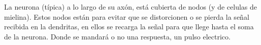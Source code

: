 La neurona (típica) a lo largo de su axón, está cubierta de nodos (y de celulas de mielina). Estos nodos están para evitar que se distorcionen o se pierda la señal recibida en la dendritas, en ellos se recarga la señal para que llege hasta el soma de la neurona. Donde se mandará o no una respuesta, un pulso electrico.  






 
 


